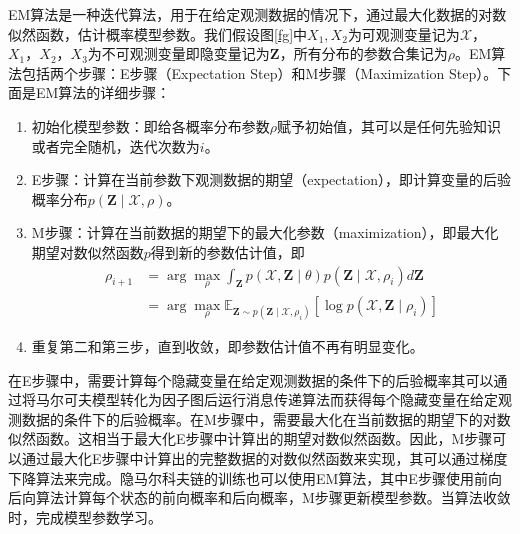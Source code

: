 \documentclass{xdupgthesis}
\begin{document}
EM算法是一种迭代算法，用于在给定观测数据的情况下，通过最大化数据的对数似然函数，估计概率模型参数。我们假设图\ref{fg}中$X_1,X_2$为可观测变量记为$\mathcal{X}$，$X_1，X_2，X_3$为不可观测变量即隐变量记为$\mathbf{Z}$，所有分布的参数合集记为$\rho$。EM算法包括两个步骤：E步骤（Expectation Step）和M步骤（Maximization Step）。下面是EM算法的详细步骤：
\begin{enumerate}
    \item 初始化模型参数：即给各概率分布参数$\rho$赋予初始值，其可以是任何先验知识或者完全随机，迭代次数为$i$。
    \item E步骤：计算在当前参数下观测数据的期望（expectation），即计算变量的后验概率分布$p(\mathbf{Z}\mid\mathcal{X},\rho)$。
    \item M步骤：计算在当前数据的期望下的最大化参数（maximization），即最大化期望对数似然函数$p$得到新的参数估计值，即
\begin{equation}
    \begin{aligned}
        \rho_{i+1} & =\arg \max _{\rho} \int_{\mathbf{Z}} p(\mathcal{X}, \mathbf{Z} \mid \theta) p\left(\mathbf{Z} \mid \mathcal{X}, \rho_{i}\right) d \mathbf{Z} \\
        & =\arg \max _{\rho} \mathbb{E}_{\mathbf{Z} \sim p\left(\mathbf{Z} \mid \mathcal{X}, \rho_{i}\right)}[\log p(\mathcal{X}, \mathbf{Z} \mid \rho_i)]
        \end{aligned}
\end{equation}
    \item 重复第二和第三步，直到收敛，即参数估计值不再有明显变化。
\end{enumerate}

在E步骤中，需要计算每个隐藏变量在给定观测数据的条件下的后验概率其可以通过将马尔可夫模型转化为因子图后运行消息传递算法而获得每个隐藏变量在给定观测数据的条件下的后验概率。在M步骤中，需要最大化在当前数据的期望下的对数似然函数。这相当于最大化E步骤中计算出的期望对数似然函数。因此，M步骤可以通过最大化E步骤中计算出的完整数据的对数似然函数来实现，其可以通过梯度下降算法来完成。隐马尔科夫链的训练也可以使用EM算法，其中E步骤使用前向后向算法计算每个状态的前向概率和后向概率，M步骤更新模型参数。当算法收敛时，完成模型参数学习。
\end{document}
